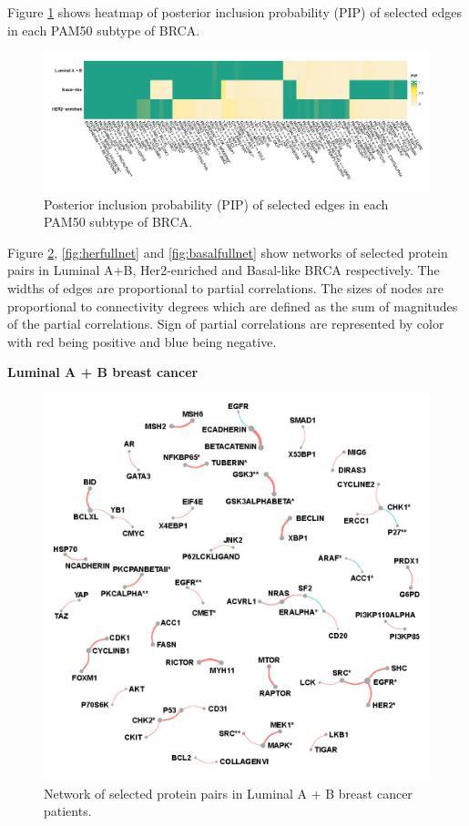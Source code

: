 \documentclass[
]{book}
\begin{document}
Figure \ref{fig:pampip} shows heatmap of posterior inclusion probability (PIP) of selected edges in each PAM50 subtype of BRCA.

\begin{figure}

{\centering \includegraphics[width=0.95\linewidth]{images/subtype_pip} 

}

\caption{Posterior inclusion probability (PIP) of selected edges in each PAM50 subtype of BRCA.}\label{fig:pampip}
\end{figure}

Figure \ref{fig:lumfullnet}, \ref{fig:herfullnet} and \ref{fig:basalfullnet} show networks of selected protein pairs in Luminal A+B, Her2-enriched and Basal-like BRCA respectively. The widths of edges are proportional to partial correlations. The sizes of nodes are proportional to connectivity degrees which are defined as the sum of magnitudes of the partial correlations. Sign of partial correlations are represented by color with red being positive and blue being negative.

\textbf{Luminal A + B breast cancer}

\begin{figure}

{\centering \includegraphics[width=0.7\linewidth]{images/subtype_fullnet_lum} 

}

\caption{Network of selected protein pairs in Luminal A +  B breast cancer patients.}\label{fig:lumfullnet}
\end{figure}
\end{document}
